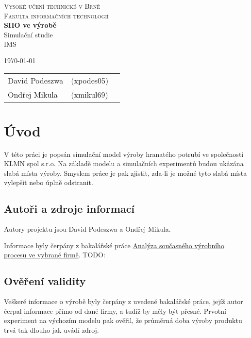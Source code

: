 \documentclass[11pt, a4paper]{article}
\begin{document}
\begin{titlepage}
\begin{center}
\Huge
\textsc{Vysoké učení technické v Brně}\\
\huge
\textsc{Fakulta informačních technologií}\\
\LARGE
{\bf SHO ve výrobě}\\Simulační studie\\IMS
{}
\end{center}
\Large
\today\hfill
\begin{tabular}{l l l}
		David Podeszwa & (xpodes05)\\
		Ondřej Mikula & (xmikul69)\\
\end{tabular}
\end{titlepage}

\newpage
\tableofcontents
\newpage


\section{Úvod}
V této práci je popsán simulační model výroby hranatého potrubí ve společnosti KLMN spol s.r.o. Na základě modelu a simulačních experimentů budou ukázána slabá místa výroby. Smyslem práce je pak zjistit, zda-li je možné tyto slabá místa vylepšit nebo úplně odstranit. 
\subsection{Autoři a zdroje informací}
Autory projektu jsou David Podeszwa a Ondřej Mikula. 


Informace byly čerpány z bakalářské práce \href{http://digilib.k.utb.cz/bitstream/handle/10563/22155/%20ih%C3%A1k_2012_bp.pdf?sequence=1}{Analýza současného výrobního procesu ve 
vybrané firmě}. TODO:%
\subsection{Ověření validity}
Veškeré informace o výrobě byly čerpány z uvedené bakalářské práce, jejíž autor čerpal informace přímo od dané firmy, a tudíž by měly být přesné. Prvotní experiment na výchozím modelu pak ověřil, že průměrná doba výroby produktu trvá tak dlouho jak uvádí zdroj.
\end{document}
